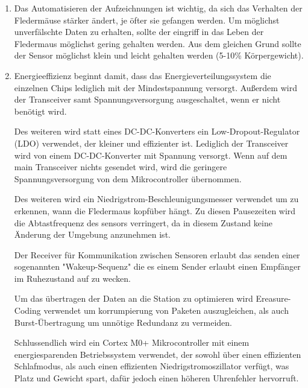 

\date{Sonntag, 17.05.2020}


    \maketitle
    \thispagestyle{fancy}


    \begin{enumerate}
        \item Das Automatisieren der Aufzeichnungen ist wichtig, da sich das Verhalten der Fledermäuse stärker ändert, je öfter sie gefangen werden. Um möglichst unverfälschte Daten zu erhalten, sollte der eingriff in das Leben der Fledermaus möglichst gering gehalten werden. Aus dem gleichen Grund sollte der Sensor möglichst klein und leicht gehalten werden (5-10\% Körpergewicht).

        \item Energieeffizienz beginnt damit, dass das Energieverteilungssystem die einzelnen Chips lediglich mit der Mindestspannung versorgt. Außerdem wird der Transceiver samt Spannungsversorgung ausgeschaltet, wenn er nicht benötigt wird.

        Des weiteren wird statt eines DC-DC-Konverters ein Low-Dropout-Regulator (LDO) verwendet, der kleiner und effizienter ist. Lediglich der Transceiver wird von einem DC-DC-Konverter mit Spannung versorgt. Wenn auf dem main Transceiver nichts gesendet wird, wird die geringere Spannungsversorgung von dem Mikrocontroller übernommen.

        Des weiteren wird ein Niedrigstrom-Beschleunigungs\-messer verwendet um zu erkennen, wann die Fledermaus kopfüber hängt. Zu diesen Pausezeiten wird die Abtastfrequenz des sensors verringert, da in diesem Zustand keine Änderung der Umgebung anzunehmen ist.

        Der Receiver für Kommunikation zwischen Sensoren erlaubt das senden einer sogenannten "Wakeup-Sequenz" die es einem Sender erlaubt einen Empfänger im Ruhezustand auf zu wecken.

        Um das übertragen der Daten an die Station zu optimieren wird Ereasure-Coding verwendet um korrumpierung von Paketen auszugleichen, als auch Burst-Übertragung um unnötige Redundanz zu vermeiden.

        Schlussendlich wird ein Cortex M0+ Mikrocontroller mit einem energiesparenden Betriebssystem verwendet, der sowohl über einen effizienten Schlafmodus, als auch einen effizienten Niedrigstromoszillator verfügt, was Platz und Gewicht spart, dafür jedoch einen höheren Uhrenfehler hervorruft.


\end{enumerate}
